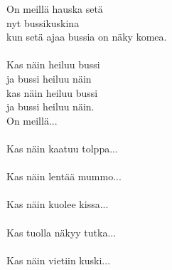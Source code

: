 
On meillä hauska setä \\ nyt bussikuskina \\ kun setä ajaa bussia on näky komea. \\ \hspace{10mm} \\ Kas näin heiluu bussi \\ ja bussi heiluu näin \\ kas näin heiluu bussi \\ ja bussi heiluu näin. \\ On meillä... \\ \hspace{10mm} \\ Kas näin kaatuu tolppa... \\ \hspace{10mm} \\ Kas näin lentää mummo... \\ \hspace{10mm} \\ Kas näin kuolee kissa... \\ \hspace{10mm} \\ Kas tuolla näkyy tutka... \\ \hspace{10mm} \\ Kas näin vietiin kuski...